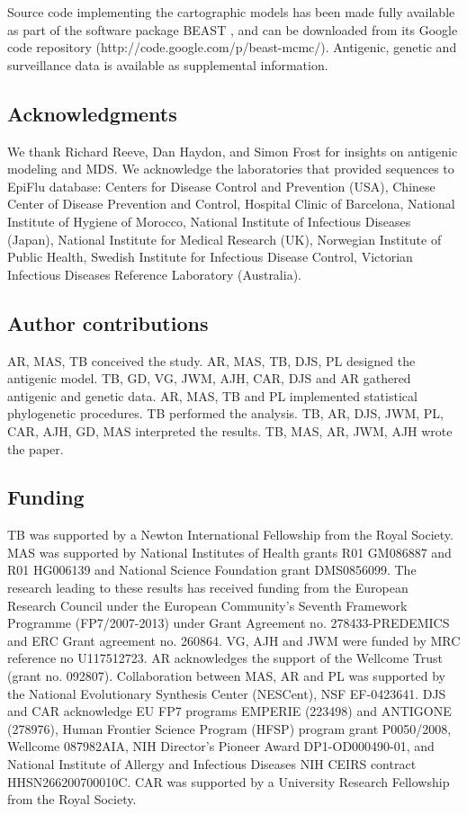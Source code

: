 \documentclass[11pt,oneside,letterpaper]{article}
\begin{document}
Source code implementing the cartographic models has been made fully available as part of the software package BEAST \cite{BEAST17}, and can be downloaded from its Google code repository (http://code.google.com/p/beast-mcmc/).
Antigenic, genetic and surveillance data is available as supplemental information.

\subsection*{Acknowledgments} 

We thank Richard Reeve, Dan Haydon, and Simon Frost for insights on antigenic modeling and MDS.
We acknowledge the laboratories that provided sequences to EpiFlu database: Centers for Disease Control and Prevention (USA), Chinese Center of Disease Prevention and Control, Hospital Clinic of Barcelona, National Institute of Hygiene of Morocco, National Institute of Infectious Diseases (Japan), National Institute for Medical Research (UK), Norwegian Institute of Public Health, Swedish Institute for Infectious Disease Control, Victorian Infectious Diseases Reference Laboratory (Australia).

\subsection*{Author contributions} 

AR, MAS, TB conceived the study.
AR, MAS, TB, DJS, PL designed the antigenic model.
TB, GD, VG, JWM, AJH, CAR, DJS and AR gathered antigenic and genetic data.
AR, MAS, TB and PL implemented statistical phylogenetic procedures.
TB performed the analysis.
TB, AR, DJS, JWM, PL, CAR, AJH, GD, MAS interpreted the results.
TB, MAS, AR, JWM, AJH wrote the paper.

\subsection*{Funding} 

TB was supported by a Newton International Fellowship from the Royal Society. 
MAS was supported by National Institutes of Health grants R01 GM086887 and R01 HG006139 and National Science Foundation grant DMS0856099.
The research leading to these results has received funding from the European Research Council under the European Community's Seventh Framework Programme (FP7/2007-2013) under Grant Agreement no. 278433-PREDEMICS and ERC Grant agreement no. 260864.
VG, AJH and JWM were funded by MRC reference no U117512723.
AR acknowledges the support of the Wellcome Trust (grant no. 092807).
Collaboration between MAS, AR and PL was supported by the National Evolutionary Synthesis Center (NESCent), NSF EF-0423641.
DJS and CAR acknowledge EU FP7 programs EMPERIE (223498) and ANTIGONE (278976), Human Frontier Science Program (HFSP) program grant P0050/2008, Wellcome 087982AIA, NIH Director's Pioneer Award DP1-OD000490-01, and National Institute of Allergy and Infectious Diseases NIH CEIRS contract HHSN266200700010C.
CAR was supported by a University Research Fellowship from the Royal Society.
\end{document}
